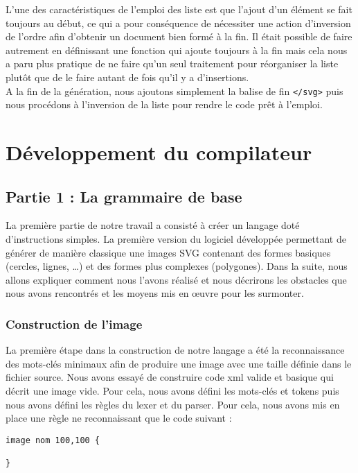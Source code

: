 		L'une des caractéristiques de l'emploi des liste est que l'ajout d'un élément se fait toujours au début, ce qui a pour conséquence de nécessiter une action d'inversion de l'ordre afin d'obtenir un document bien formé à la fin. Il était possible de faire autrement en définissant une fonction qui ajoute toujours à la fin mais cela nous a paru plus pratique de ne faire qu'un seul traitement pour réorganiser la liste plutôt que de le faire autant de fois qu'il y a d'insertions.\\
	
		A la fin de la génération, nous ajoutons simplement la balise de fin \texttt{</svg>} puis nous procédons à l'inversion de la liste pour rendre le code prêt à l'emploi. 
	
\chapter{Développement du compilateur}
	
	\section{Partie 1 : La grammaire de base}
		La première partie de notre travail a consisté à créer un langage doté d'instructions simples. 	La première version du logiciel développée permettant de générer de manière classique une images SVG contenant des formes basiques (cercles, lignes, \dots) et des formes plus complexes (polygones). Dans la suite, nous allons expliquer comment nous l'avons réalisé et nous décrirons les obstacles que nous avons rencontrés et les moyens mis en œuvre pour les surmonter.

		\subsection{Construction de l'image}
			La première étape dans la construction de notre langage a été la reconnaissance des mots-clés minimaux afin de produire une image avec une taille définie dans le fichier source. Nous avons essayé de construire code xml valide et basique qui décrit une image vide. Pour cela, nous avons défini les mots-clés et tokens puis nous avons défini les règles du lexer et du parser. Pour cela, nous avons mis en place une règle ne reconnaissant que le code suivant : 
\begin{lstlisting}[morekeywords={image}]
image nom 100,100 {

}
\end{lstlisting}
		

